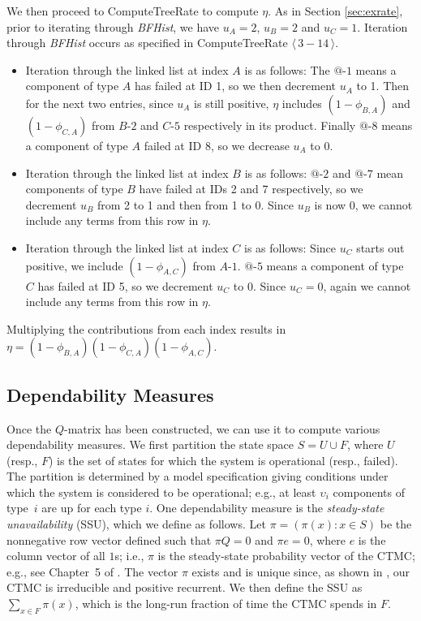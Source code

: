 \documentclass[12pt]{article}
\newcommand{\varName}[1]{\textrm{\it#1}}
\newcommand{\citeBlock}[2]{$\langle \, #1 - #2 \, \rangle$}
\newcommand{\nodeLabel}[2]{\mbox{$#1$-$#2$}}
\begin{document}
We then proceed to ComputeTreeRate to compute $\eta$. As in Section
\ref{sec:exrate}, prior to iterating through \varName{BFHist}, we have $u_A =
2$, $u_B = 2$ and $u_C = 1$. Iteration through \varName{BFHist} occurs as
specified in ComputeTreeRate \citeBlock{3}{14}.

\begin{itemize}
\item Iteration through the linked list at index $A$ is as follows: The
\nodeLabel{@}{1} means a component of type $A$ has failed at ID 1, so we then
decrement $u_{A}$ to 1. Then for the next two entries, since $u_{A}$ is still
positive, $\eta$ includes $(1 - \phi_{B, A})$ and $(1 - \phi_{C, A})$ from
\nodeLabel{B}{2} and \nodeLabel{C}{5} respectively in its product. Finally
\nodeLabel{@}{8} means a component of type $A$ failed at ID 8, so we decrease
$u_A$ to 0.

\item Iteration through the linked list at index $B$ is as follows:
\nodeLabel{@}{2} and \nodeLabel{@}{7} mean components of type $B$ have failed at
IDs 2 and 7 respectively, so we decrement $u_{B}$ from 2 to 1 and then from 1 to
0. Since $u_{B}$ is now 0, we cannot include any terms from this row in $\eta$.

\item Iteration through the linked list at index $C$ is as follows: Since
$u_{C}$ starts out positive, we include $(1 - \phi_{A, C})$ from
\nodeLabel{A}{1}. \nodeLabel{@}{5} means a component of type $C$ has failed at
ID 5, so we decrement $u_{C}$ to 0. Since $u_{C} = 0$, again we cannot include
any terms from this row in $\eta$.
\end{itemize}
Multiplying the contributions from each index results in $\eta = (1 - \phi_{B,
A}) (1 - \phi_{C, A}) (1 - \phi_{A, C})$.


\subsection{Dependability Measures}
\label{sec:depend}

Once the $Q$-matrix has been constructed,
we can use it to compute various dependability measures. We first partition
the state space $S = U \cup F$, where $U$ (resp., $F$) is the set of states
for which the system is operational (resp., failed). The partition is
determined by a model specification giving conditions under which the system
is considered to be operational; e.g., at least $\upsilon_i$ components of
type~$i$ are up for each type $i$. One dependability measure is the
\textit{steady-state unavailability} (SSU), which we define as follows. Let
$\pi = (\pi(x) : x \in S)$ be the nonnegative row vector defined such that
$\pi Q = 0$ and $\pi e = 0$, where $e$ is the column vector of all $1$s; i.e.,
$\pi$ is the steady-state probability vector of the CTMC; e.g., see Chapter~5
of
\cite{Ross:1995}.
The vector $\pi$ exists and is unique since, as shown in \cite{ING:2009}, our
CTMC is irreducible and positive recurrent. We then define the SSU as $\sum_{x
\in F} \pi(x)$, which is the long-run fraction of time the CTMC spends in $F$.
\end{document}
